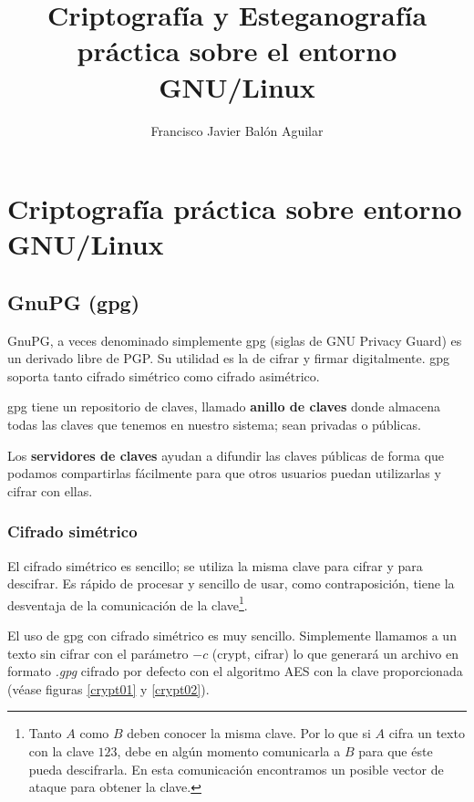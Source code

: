 \documentclass[a4paper, 11pt, titlepage]{article}
\title{Criptografía y Esteganografía práctica sobre el entorno GNU/Linux}
\author{Francisco Javier Balón Aguilar}
\begin{document}
\maketitle
\renewcommand{\contentsname}{Índice}
\tableofcontents
\newpage

\section{Criptografía práctica sobre entorno GNU/Linux}

    \subsection{GnuPG (gpg)}
        
    GnuPG, a veces denominado simplemente gpg (siglas de GNU Privacy Guard) es un derivado libre
    de PGP. Su utilidad es la de cifrar y firmar digitalmente. gpg soporta tanto cifrado simétrico 
    como cifrado asimétrico.

    gpg tiene un repositorio de claves, llamado \textbf{anillo de claves} 
    donde almacena todas las claves que tenemos en nuestro sistema; sean privadas o públicas.

    Los \textbf{servidores de claves} ayudan a difundir las claves públicas 
    de forma que podamos compartirlas fácilmente para que otros usuarios puedan utilizarlas y
    cifrar con ellas.

    \subsubsection{Cifrado simétrico}

        El cifrado simétrico es sencillo; se utiliza la misma clave para cifrar y para descifrar.
        Es rápido de procesar y sencillo de usar, como contraposición, tiene la desventaja de la 
        comunicación de la clave\footnote{
            Tanto $A$ como $B$ deben conocer la misma clave. Por lo que si $A$ cifra un texto con
            la clave $123$, debe en algún momento comunicarla a $B$ para que éste pueda descifrarla.
            En esta comunicación encontramos un posible vector de ataque para obtener la clave.
        }.

        El uso de gpg con cifrado simétrico es muy sencillo. Simplemente llamamos a un texto sin cifrar
        con el parámetro $-c$ (crypt, cifrar) lo que generará un archivo en formato \textit{.gpg} cifrado
        por defecto con el algoritmo AES con la clave proporcionada (véase figuras \ref{crypt01} y 
        \ref{crypt02}).
\end{document}
